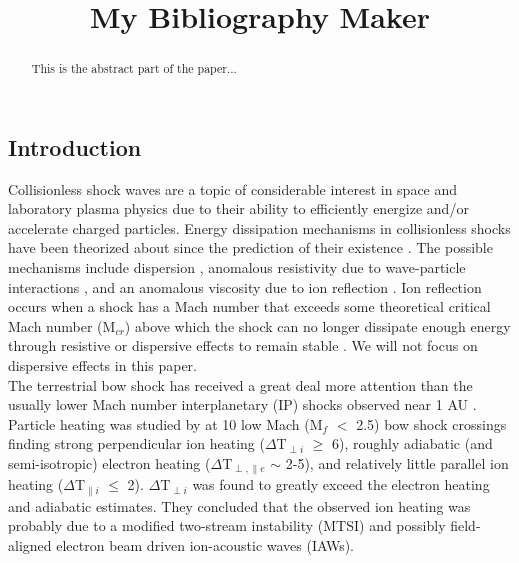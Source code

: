 \documentclass[grl]{AGUTeX}
\begin{document}

\title{My Bibliography Maker}


\begin{abstract}
  This is the abstract part of the paper...
\end{abstract}

\begin{article}
\section{Introduction}  \label{sec:introduction}
\indent  Collisionless shock waves are a topic of considerable interest in space and laboratory plasma physics due to their ability to efficiently energize and/or accelerate charged particles.  Energy dissipation mechanisms in collisionless shocks have been theorized about since the prediction of their existence \citep{kellogg62a}.  The possible mechanisms include dispersion \citep{mellott84a}, anomalous resistivity due to wave-particle interactions \citep{kennel82a}, and an anomalous viscosity due to ion reflection \citep{thomsen85a}.  Ion reflection occurs when a shock has a Mach number that exceeds some theoretical critical Mach number (M${\scriptstyle_{cr}}$) above which the shock can no longer dissipate enough energy through resistive or dispersive effects to remain stable \citep{edmiston84,kennel87a}.  We will not focus on dispersive effects in this paper.  \\
\indent  The terrestrial bow shock has received a great deal more attention \citep{bale97a,bale98b,bale02a} than the usually lower Mach number interplanetary (IP) shocks observed near 1 AU \citep{fitzenreiter03,gurnett79a,wilsoniii07a}.  Particle heating was studied by \citet{thomsen85a} at 10 low Mach (M${\scriptstyle_{f}}$ $<$ 2.5) bow shock crossings finding strong perpendicular ion heating ($\Delta$T${\scriptstyle_{\perp i}}$ $\geq$ 6), roughly adiabatic (and semi-isotropic) electron heating ($\Delta$T${\scriptstyle_{\perp, \parallel e}}$ $\sim$ 2-5), and relatively little parallel ion heating ($\Delta$T${\scriptstyle_{\parallel i}}$ $\leq$ 2).  $\Delta$T${\scriptstyle_{\perp i}}$ was found to greatly exceed the electron heating and adiabatic estimates.  They concluded that the observed ion heating was probably due to a modified two-stream instability (MTSI) and possibly field-aligned electron beam driven ion-acoustic waves (IAWs).


\end{article}
\end{document}
